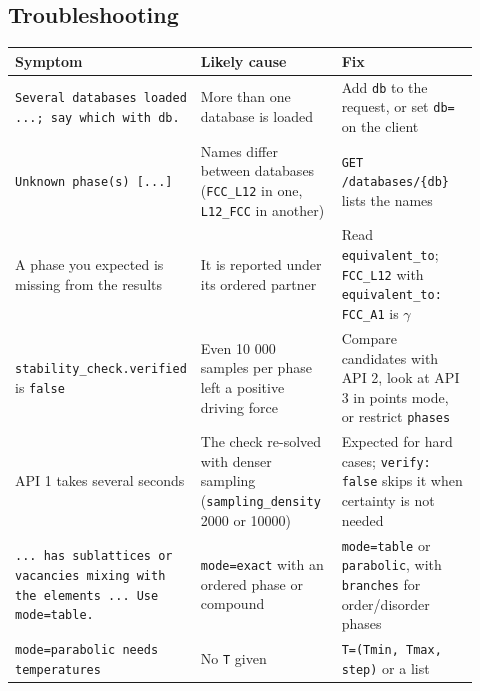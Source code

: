 \documentclass[12pt,a4paper]{article}
\begin{document}
\subsection*{Troubleshooting}
\begingroup\small
\begin{longtable}{>{\raggedright\arraybackslash}p{0.287\linewidth}>{\raggedright\arraybackslash}p{0.319\linewidth}>{\raggedright\arraybackslash}p{0.315\linewidth}}
\toprule
\textbf{Symptom} & \textbf{Likely cause} & \textbf{Fix} \\
\midrule
\endhead
\texttt{Several databases loaded .\allowbreak{}.\allowbreak{}.\allowbreak{}; say which with \textquotesingle{}db\textquotesingle{}.\allowbreak{}} & More than one database is loaded & Add \texttt{\textquotedbl{}db\textquotedbl{}} to the request, or set \texttt{db=} on the client \\
\texttt{Unknown phase(s) [.\allowbreak{}.\allowbreak{}.\allowbreak{}]} & Names differ between databases (\texttt{FCC\_\allowbreak{}L12} in one, \texttt{L12\_\allowbreak{}FCC} in another) & \texttt{GET /\allowbreak{}databases/\allowbreak{}\{db\}} lists the names \\
A phase you expected is missing from the results & It is reported under its ordered partner & Read \texttt{equivalent\_\allowbreak{}to}; \texttt{FCC\_\allowbreak{}L12} with \texttt{equivalent\_\allowbreak{}to: \textquotedbl{}FCC\_\allowbreak{}A1\textquotedbl{}} is \(\gamma\) \\
\texttt{stability\_\allowbreak{}check.\allowbreak{}verified} is \texttt{false} & Even 10 000 samples per phase left a positive driving force & Compare candidates with API 2, look at API 3 in points mode, or restrict \texttt{phases} \\
API 1 takes several seconds & The check re-solved with denser sampling (\texttt{sampling\_\allowbreak{}density} 2000 or 10000) & Expected for hard cases; \texttt{verify: false} skips it when certainty is not needed \\
\texttt{.\allowbreak{}.\allowbreak{}.\allowbreak{} has sublattices or vacancies mixing with the elements .\allowbreak{}.\allowbreak{}.\allowbreak{} Use mode=\textquotesingle{}table\textquotesingle{}.\allowbreak{}} & \texttt{mode=\textquotedbl{}exact\textquotedbl{}} with an ordered phase or compound & \texttt{mode=\textquotedbl{}table\textquotedbl{}} or \texttt{\textquotedbl{}parabolic\textquotedbl{}}, with \texttt{branches} for order/disorder phases \\
\texttt{mode=\textquotesingle{}parabolic\textquotesingle{} needs temperatures} & No \texttt{T} given & \texttt{T=(Tmin,\allowbreak{} Tmax,\allowbreak{} step)} or a list \\

\end{longtable}
\end{document}
